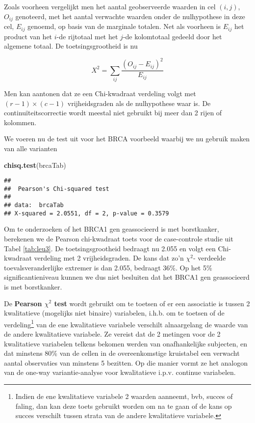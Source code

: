 \documentclass[
  12pt,dutch,coursenotes]{book}
\newenvironment{Shaded}{\begin{snugshade}}{\end{snugshade}}
\newcommand{\KeywordTok}[1]{\textcolor[rgb]{0.13,0.29,0.53}{\textbf{#1}}}
\newcommand{\NormalTok}[1]{#1}
\theoremstyle{definition}
\theoremstyle{definition}
\theoremstyle{definition}
\theoremstyle{remark}
\begin{document}
Zoals voorheen vergelijkt men het aantal geobserveerde waarden in cel \((i,j)\), \(O_{ij}\) genoteerd, met het aantal verwachte waarden onder de nulhypothese
in deze cel, \(E_{ij}\) genoemd, op basis van de marginale totalen. Net als
voorheen is \(E_{ij}\) het product van het \(i\)-de rijtotaal met het \(j\)-de
kolomtotaal gedeeld door het algemene totaal. De toetsingsgrootheid is nu

\begin{equation*}
X^2 = \sum_{ij} \frac{\left (O_{ij} - E_{ij}\right)^2 }{ E_{ij}}
\end{equation*}

Men kan aantonen dat ze een Chi-kwadraat verdeling volgt met \((r-1) \times (c-1)\) vrijheidsgraden als de nulhypothese waar is. De continuïteitscorrectie wordt meestal niet gebruikt bij meer dan 2 rijen of
kolommen.

We voeren nu de test uit voor het BRCA voorbeeld waarbij we nu gebruik maken van alle varianten

\begin{Shaded}
\begin{Highlighting}[]
\KeywordTok{chisq.test}\NormalTok{(brcaTab)}
\end{Highlighting}
\end{Shaded}

\begin{verbatim}
## 
##  Pearson's Chi-squared test
## 
## data:  brcaTab
## X-squared = 2.0551, df = 2, p-value = 0.3579
\end{verbatim}

Om te onderzoeken of het BRCA1 gen geassocieerd is met borstkanker, berekenen we de Pearson chi-kwadraat toets voor de case-controle studie uit Tabel \ref{tab:leu3}. De toetsingsgrootheid bedraagt nu 2.055 en volgt een Chi-kwadraat verdeling met 2 vrijheidsgraden. De kans dat zo'n \(\chi^2\)- verdeelde toevalsveranderlijke extremer is dan 2.055, bedraagt 36\%.
Op het 5\% significantieniveau kunnen we dus niet besluiten dat het BRCA1 gen geassocieerd is met borstkanker.

De \textbf{Pearson \(\chi^2\) test} wordt gebruikt om te toetsen of er een associatie is tussen 2 kwalitatieve (mogelijks niet binaire) variabelen, i.h.b. om te toetsen of de verdeling\footnote{Indien de ene kwalitatieve variabele 2 waarden aanneemt, bvb, succes of faling, dan kan deze toets gebruikt worden om na te gaan of de kans op succes verschilt tussen strata van de andere kwalitatieve variabele.} van de ene kwalitatieve variabele verschilt alnaargelang de waarde van de andere kwalitatieve variabele. Ze vereist dat de 2 metingen voor de 2 kwalitatieve variabelen telkens bekomen werden van onafhankelijke subjecten, en dat minstens 80\% van de cellen in de overeenkomstige kruistabel een verwacht aantal observaties van minstens 5 bezitten. Op die manier vormt ze het analogon van de one-way variantie-analyse voor kwalitatieve i.p.v. continue variabelen.
\end{document}
